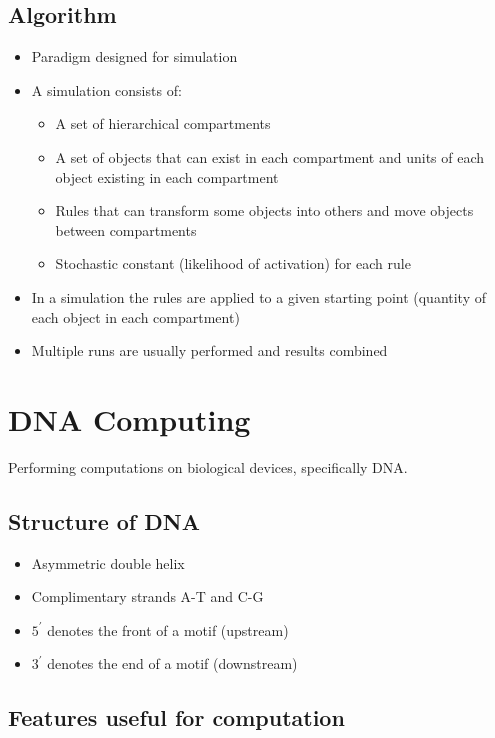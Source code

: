 \documentclass[a4paper]{article}
\begin{document}
\subsection{Algorithm}

\begin{itemize}
  \item Paradigm designed for simulation
  \item A simulation consists of:
    \begin{itemize}
      \item A set of hierarchical compartments
      \item A set of objects that can exist in each compartment and units of
            each object existing in each compartment
      \item Rules that can transform some objects into others and move objects
            between compartments
      \item Stochastic constant (likelihood of activation) for each rule
    \end{itemize}
  \item In a simulation the rules are applied to a given starting point
        (quantity of each object in each compartment)
  \item Multiple runs are usually performed and results combined
\end{itemize}

\section{DNA Computing}
\label{sec:dna}

Performing computations on biological devices, specifically DNA.

\subsection{Structure of DNA}

\begin{itemize}
  \item Asymmetric double helix
  \item Complimentary strands A-T and C-G
  \item $5^{\prime}$ denotes the front of a motif (upstream)
  \item $3^{\prime}$ denotes the end of a motif (downstream)
\end{itemize}

\subsection{Features useful for computation}
\end{document}
